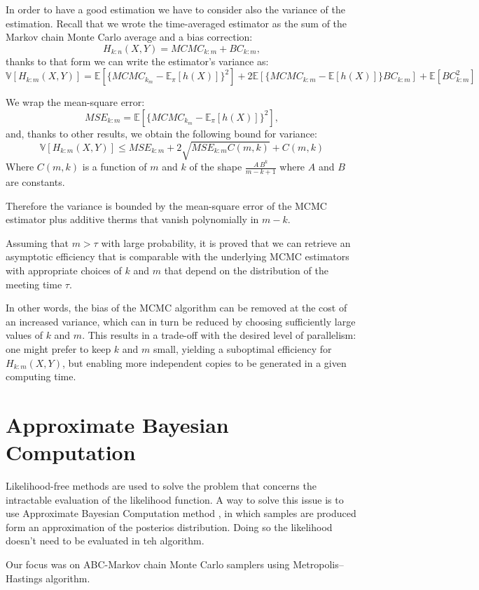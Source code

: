 \documentclass[11pt,a4paper,oneside]{report}
\begin{document}
In order to have a good estimation we have to consider also the variance of the estimation. Recall that we wrote the time-averaged estimator as the sum of the Markov chain Monte Carlo average and a bias correction: 
$$ 
H_{k:n}(X,Y) 
= MCMC_{k:m} + BC_{k:m},$$
thanks to that form we can write the estimator's variance as:
$$ 
\mathbb{V}[H_{k:m}(X,Y)] 
= \mathbb{E}[\{MCMC_{k_m} - \mathbb{E}_\pi[h(X)]\}^2] 
+ 2 \mathbb{E}[\{MCMC_{k:m} - \mathbb{E}[h(X)]\}BC_{k:m}] 
+ \mathbb{E}[BC_{k:m}^2] 
$$

We wrap the mean-square error:
$$
MSE_{k:m}=  \mathbb{E}[\{MCMC_{k_m} - \mathbb{E}_\pi[h(X)]\}^2],
$$
and, thanks to other results, we obtain the following bound for variance:
$$
\mathbb{V}[H_{k:m}(X,Y)]
\leq MSE_{k:m} + 2 \sqrt{MSE_{k:m} C(m,k)} + C(m,k)
$$
Where $C(m,k)$ is a function of $m$ and $k$ of the shape $\frac{A \, B^k}{m-k+1}$ where $A$ and $B$ are constants.

Therefore the variance is bounded by the mean-square error of the MCMC estimator plus additive therms that vanish polynomially in $m-k$.

Assuming that $m > \tau$ with large probability, it is proved that we can retrieve an asymptotic efficiency that is comparable with the underlying MCMC estimators with appropriate choices of $k$ and $m$ that depend on the distribution of the meeting time $\tau$.

In other words, the bias of the MCMC algorithm can be removed at the cost of an increased variance, which can in turn be reduced by choosing sufficiently large values of $k$ and $m$. This results in a trade-off with the desired level of parallelism: one might prefer to keep $k$ and $m$ small, yielding a suboptimal efficiency for $H_{k:m}(X,Y)$, but enabling more independent copies to be generated in a given computing time.


\section{Approximate Bayesian Computation}

Likelihood-free methods are used to solve the problem that concerns the intractable evaluation of the likelihood function. A way to solve this issue is to use Approximate Bayesian Computation method \cite{sisson2018overview}, in which samples are produced form an approximation of the posterios distribution.
Doing so the likelihood doesn't need to be evaluated in teh algorithm.

Our focus was on ABC-Markov chain Monte Carlo samplers using Metropolis–Hastings algorithm.
\end{document}
